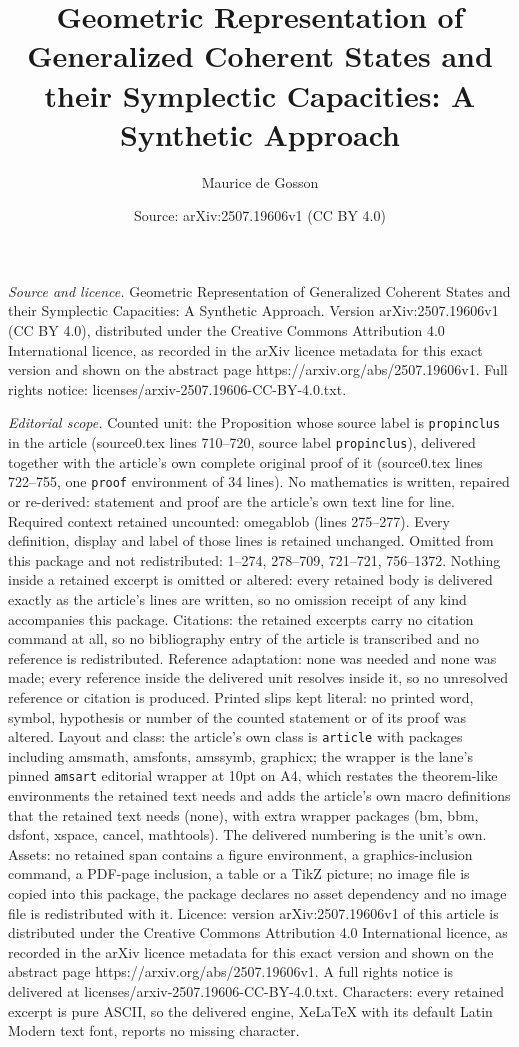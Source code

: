 \documentclass[10pt,a4paper]{amsart}
\title[Geometric Representation of Generalized Coherent States and ]{Geometric Representation of Generalized Coherent States and their Symplectic Capacities: A Synthetic Approach}
\author{Maurice de Gosson}
\date{Source: arXiv:2507.19606v1 (CC BY 4.0)}
\begin{document}
\maketitle

\noindent\emph{Source and licence.} Geometric Representation of Generalized Coherent States and their Symplectic Capacities: A Synthetic Approach. Version arXiv:2507.19606v1 (CC BY 4.0), distributed under the Creative Commons Attribution 4.0 International licence, as recorded in the arXiv licence metadata for this exact version and shown on the abstract page https://arxiv.org/abs/2507.19606v1. Full rights notice: licenses/arxiv-2507.19606-CC-BY-4.0.txt.\par\smallskip

\noindent\textit{Editorial scope.} Counted unit: the Proposition whose source label is \texttt{propinclus} in the article (source0.tex lines 710--720, source label \texttt{propinclus}), delivered together with the article's own complete original proof of it (source0.tex lines 722--755, one \texttt{proof} environment of 34 lines). No mathematics is written, repaired or re-derived: statement and proof are the article's own text line for line. Required context retained uncounted: omegablob (lines 275--277). Every definition, display and label of those lines is retained unchanged. Omitted from this package and not redistributed: 1--274, 278--709, 721--721, 756--1372. Nothing inside a retained excerpt is omitted or altered: every retained body is delivered exactly as the article's lines are written, so no omission receipt of any kind accompanies this package. Citations: the retained excerpts carry no citation command at all, so no bibliography entry of the article is transcribed and no reference is redistributed. Reference adaptation: none was needed and none was made; every reference inside the delivered unit resolves inside it, so no unresolved reference or citation is produced. Printed slips kept literal: no printed word, symbol, hypothesis or number of the counted statement or of its proof was altered. Layout and class: the article's own class is \texttt{article} with packages including amsmath, amsfonts, amssymb, graphicx; the wrapper is the lane's pinned \texttt{amsart} editorial wrapper at 10pt on A4, which restates the theorem-like environments the retained text needs and adds the article's own macro definitions that the retained text needs (none), with extra wrapper packages (bm, bbm, dsfont, xspace, cancel, mathtools). The delivered numbering is the unit's own. Assets: no retained span contains a figure environment, a graphics-inclusion command, a PDF-page inclusion, a table or a TikZ picture; no image file is copied into this package, the package declares no asset dependency and no image file is redistributed with it. Licence: version arXiv:2507.19606v1 of this article is distributed under the Creative Commons Attribution 4.0 International licence, as recorded in the arXiv licence metadata for this exact version and shown on the abstract page https://arxiv.org/abs/2507.19606v1. A full rights notice is delivered at licenses/arxiv-2507.19606-CC-BY-4.0.txt. Characters: every retained excerpt is pure ASCII, so the delivered engine, XeLaTeX with its default Latin Modern text font, reports no missing character.
\end{document}
